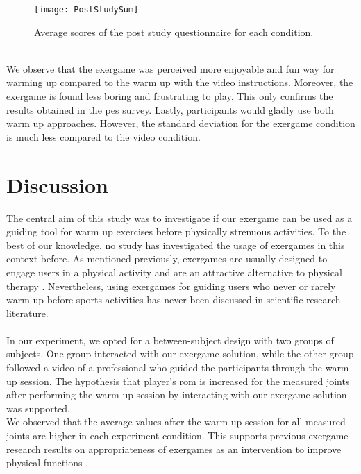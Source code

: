 \begin{figure}[h]
    \centering
    \texttt{[image: PostStudySum]}
    \caption{Average scores of the post study questionnaire for each condition.}
    \label{fig:poststudysum}
\end{figure}\\ We observe that the exergame was perceived more enjoyable and fun way for warming up compared to the warm up with the video instructions. Moreover, the exergame is found less boring and frustrating to play.  This only confirms the results obtained in the \acrshort{pes} survey. Lastly, participants would gladly use both warm up approaches. However, the standard deviation for the exergame condition is much less compared to the video condition.
\section{Discussion}
The central aim of this study was to investigate if our exergame can be used as a guiding tool for warm up exercises before physically strenuous activities. To the best of our knowledge, no study has investigated the usage of exergames in this context before. As mentioned previously, exergames are usually designed to engage users in a physical activity \cite{song2010effects, staiano2011exergames} and are an attractive alternative to physical therapy \cite{jansen2013serious}. Nevertheless, using exergames for guiding users who never or rarely warm up before sports activities has never been discussed in scientific research literature. \\\\
In our experiment, we opted for a between-subject design with two groups of subjects. One group interacted with our exergame solution, while the other group followed a video of a professional who guided the participants through the warm up session. The hypothesis that player's \acrshort{rom} is increased for the measured joints after performing the warm up session by interacting with our exergame solution was supported. \\We observed that the average values after the warm up session for all measured joints are higher in each experiment condition. This supports previous exergame research results on appropriateness  of exergames  as an intervention to improve physical functions \cite{skjaeret2016exercise}. %
